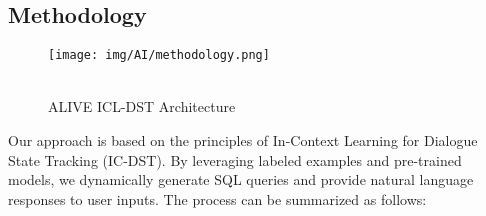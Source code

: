 \documentclass[conference]{IEEEtran}
\begin{document}
\subsection{Methodology}

\begin{figure}[h]
\hspace{1.5cm}
\centering
\begin{minipage}{0.8\columnwidth}
    \texttt{[image: img/AI/methodology.png]}
    \caption{\\ ALIVE ICL-DST Architecture }
\end{minipage}
\end{figure}

Our approach is based on the principles of In-Context Learning for Dialogue State Tracking (IC-DST). By leveraging labeled examples and pre-trained models, we dynamically generate SQL queries and provide natural language responses to user inputs. The process can be summarized as follows: \\
    
\end{document}
